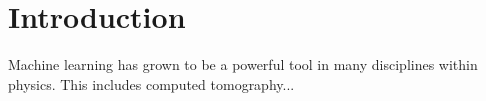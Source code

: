 \chapter{Introduction}

Machine learning has grown to be a powerful tool in many disciplines within physics. This includes computed tomography...